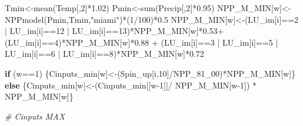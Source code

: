 \documentclass[
  10pt,
  b5paper,
]{book}
\newenvironment{Shaded}{\begin{snugshade}}{\end{snugshade}}
\newcommand{\CommentTok}[1]{\textcolor[rgb]{0.56,0.35,0.01}{\textit{#1}}}
\newcommand{\ControlFlowTok}[1]{\textcolor[rgb]{0.13,0.29,0.53}{\textbf{#1}}}
\newcommand{\DecValTok}[1]{\textcolor[rgb]{0.00,0.00,0.81}{#1}}
\newcommand{\FloatTok}[1]{\textcolor[rgb]{0.00,0.00,0.81}{#1}}
\newcommand{\FunctionTok}[1]{\textcolor[rgb]{0.00,0.00,0.00}{#1}}
\newcommand{\NormalTok}[1]{#1}
\newcommand{\OtherTok}[1]{\textcolor[rgb]{0.56,0.35,0.01}{#1}}
\newcommand{\SpecialCharTok}[1]{\textcolor[rgb]{0.00,0.00,0.00}{#1}}
\newcommand{\StringTok}[1]{\textcolor[rgb]{0.31,0.60,0.02}{#1}}
\begin{document}
\begin{Shaded}
\begin{Highlighting}[]
\NormalTok{Tmin}\OtherTok{\textless{}{-}}\FunctionTok{mean}\NormalTok{(Temp[,}\DecValTok{2}\NormalTok{]}\SpecialCharTok{*}\FloatTok{1.02}\NormalTok{)}
\NormalTok{Pmin}\OtherTok{\textless{}{-}}\FunctionTok{sum}\NormalTok{(Precip[,}\DecValTok{2}\NormalTok{]}\SpecialCharTok{*}\FloatTok{0.95}\NormalTok{)}
\NormalTok{NPP\_M\_MIN[w]}\OtherTok{\textless{}{-}}\FunctionTok{NPPmodel}\NormalTok{(Pmin,Tmin,}\StringTok{"miami"}\NormalTok{)}\SpecialCharTok{*}\NormalTok{(}\DecValTok{1}\SpecialCharTok{/}\DecValTok{100}\NormalTok{)}\SpecialCharTok{*}\FloatTok{0.5}
\NormalTok{NPP\_M\_MIN[w]}\OtherTok{\textless{}{-}}\NormalTok{(LU\_im[i]}\SpecialCharTok{==}\DecValTok{2} \SpecialCharTok{|}\NormalTok{ LU\_im[i]}\SpecialCharTok{==}\DecValTok{12} \SpecialCharTok{|}\NormalTok{ LU\_im[i]}\SpecialCharTok{==}\DecValTok{13}\NormalTok{)}\SpecialCharTok{*}\NormalTok{NPP\_M\_MIN[w]}\SpecialCharTok{*}\FloatTok{0.53}\SpecialCharTok{+}\NormalTok{ (LU\_im[i]}\SpecialCharTok{==}\DecValTok{4}\NormalTok{)}\SpecialCharTok{*}\NormalTok{NPP\_M\_MIN[w]}\SpecialCharTok{*}\FloatTok{0.88} \SpecialCharTok{+}\NormalTok{ (LU\_im[i]}\SpecialCharTok{==}\DecValTok{3} \SpecialCharTok{|}\NormalTok{ LU\_im[i]}\SpecialCharTok{==}\DecValTok{5} \SpecialCharTok{|}\NormalTok{ LU\_im[i]}\SpecialCharTok{==}\DecValTok{6} \SpecialCharTok{|}\NormalTok{ LU\_im[i]}\SpecialCharTok{==}\DecValTok{8}\NormalTok{)}\SpecialCharTok{*}\NormalTok{NPP\_M\_MIN[w]}\SpecialCharTok{*}\FloatTok{0.72}

\ControlFlowTok{if}\NormalTok{ (w}\SpecialCharTok{==}\DecValTok{1}\NormalTok{) \{Cinputs\_min[w]}\OtherTok{\textless{}{-}}\NormalTok{(Spin\_up[i,}\DecValTok{10}\NormalTok{]}\SpecialCharTok{/}\NormalTok{NPP\_81\_00)}\SpecialCharTok{*}\NormalTok{NPP\_M\_MIN[w]\} }\ControlFlowTok{else}\NormalTok{ \{Cinputs\_min[w]}\OtherTok{\textless{}{-}}\NormalTok{(Cinputs\_min[[w}\DecValTok{{-}1}\NormalTok{]]}\SpecialCharTok{/}\NormalTok{ NPP\_M\_MIN[w}\DecValTok{{-}1}\NormalTok{]) }\SpecialCharTok{*}\NormalTok{ NPP\_M\_MIN[w]\} }

\CommentTok{\# Cinputs MAX}


\end{Highlighting}
\end{Shaded}
\end{document}
